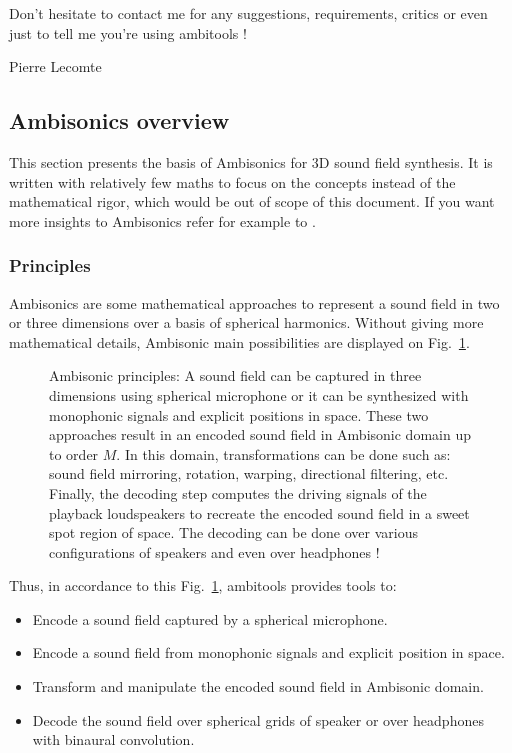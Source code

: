 \documentclass[10pt,a4paper]{article}
\begin{document}
Don't hesitate to contact me for any suggestions, requirements, critics or even just to tell me you're using ambitools !

\begin{flushright}
Pierre Lecomte
\end{flushright}

\subsection{Ambisonics overview}
This section presents the basis of Ambisonics for 3D sound field synthesis. It is written with relatively few maths to focus on the concepts instead of the mathematical rigor, which would be out of scope of this document. If you want more insights to Ambisonics refer for example to \cite{daniel2000representation,poletti2005three,ahrens2012analytic}.

\subsubsection{Principles}
Ambisonics are some mathematical approaches to represent a sound field in two or three dimensions over a basis of spherical harmonics. Without giving more mathematical details, Ambisonic main possibilities are displayed on Fig.~\ref{fig:ambisonics}.
\begin{figure}[!ht]
	\centering
	\def\svgwidth{\columnwidth}
	
	\caption{Ambisonic principles: A sound field can be captured in three dimensions using spherical microphone or it can be synthesized with monophonic signals and explicit positions in space. These two approaches result in an encoded sound field in Ambisonic domain up to order $M$. In this domain, transformations can be done such as: sound field mirroring, rotation, warping, directional filtering, etc. Finally, the decoding step computes the driving signals of the playback loudspeakers to recreate the encoded sound field in a sweet spot region of space. The decoding can be done over various configurations of speakers and even over headphones !}
	\label{fig:ambisonics}
\end{figure}

Thus, in accordance to this Fig.~\ref{fig:ambisonics}, ambitools provides tools to:
\begin{itemize}
\item Encode a sound field captured by a spherical microphone.
\item Encode a sound field from monophonic signals and explicit position in space.
\item Transform and manipulate the encoded sound field in Ambisonic domain.
\item Decode the sound field over spherical grids of speaker or over headphones with binaural convolution.
\end{itemize}
\end{document}

